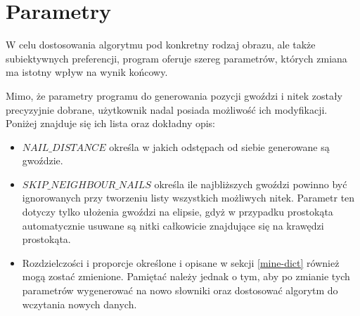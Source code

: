     \section{Parametry} \label{mine-param}
    W celu dostosowania algorytmu pod konkretny rodzaj obrazu, ale także subiektywnych preferencji, program oferuje szereg parametrów, których zmiana ma istotny wpływ na wynik końcowy.
    
    Mimo, że parametry programu do generowania pozycji gwoździ i nitek zostały precyzyjnie dobrane, użytkownik nadal posiada możliwość ich modyfikacji. Poniżej znajduje się ich lista oraz dokładny opis:
    \begin{itemize}
        \item \(NAIL\_DISTANCE\) określa w jakich odstępach od siebie generowane są gwoździe.
        \item \(SKIP\_NEIGHBOUR\_NAILS\) określa ile najbliższych gwoździ powinno być ignorowanych przy tworzeniu listy wszystkich możliwych nitek. Parametr ten dotyczy tylko ułożenia gwoździ na elipsie, gdyż w przypadku prostokąta automatycznie usuwane są nitki całkowicie znajdujące się na krawędzi prostokąta.
        \item Rozdzielczości i proporcje określone i opisane w sekcji \ref{mine-dict} również mogą zostać zmienione. Pamiętać należy jednak o tym, aby po zmianie tych parametrów wygenerować na nowo słowniki oraz dostosować algorytm do wczytania nowych danych.
    \end{itemize}
    
